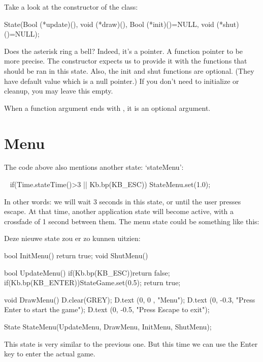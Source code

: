 Take a look at the constructor of the  class:

\begin{code}
State(Bool (*update)(), void (*draw)(), Bool (*init)()=NULL, void (*shut)()=NULL); 
\end{code}

Does the asterisk ring a bell? Indeed, it's a pointer. A function pointer to be more precise. The constructor expects us to provide it with the functions that should be ran in this state. Also, the init and shut functions are optional. (They have default value which is a null pointer.) If you don't need to initialize or cleanup, you may leave this empty.

\begin{note}
When a function argument ends with , it is an optional argument.
\end{note} 

\section{Menu}
The code above also mentions another state: `stateMenu':

\begin{code}
   if(Time.stateTime()>3 || Kb.bp(KB_ESC)) {
      StateMenu.set(1.0);                    
   }
\end{code}

In other words: we will wait 3 seconds in this state, or until the user presses escape. At that time, another application state will become active, with a crossfade of 1 second between them. The menu state could be something like this:

Deze nieuwe state zou er zo kunnen uitzien:
\begin{code}
bool InitMenu() {return true;}
void ShutMenu() {}

bool UpdateMenu()
{
   if(Kb.bp(KB_ESC))return false;
   if(Kb.bp(KB_ENTER))StateGame.set(0.5);
   return true;
}

void DrawMenu()
{
   D.clear(GREY);
   D.text (0,  0  , "Menu");
   D.text (0, -0.3, "Press Enter to start the game");
   D.text (0, -0.5, "Press Escape to exit");
}

State StateMenu(UpdateMenu, DrawMenu, InitMenu, ShutMenu);
\end{code}

This state is very similar to the previous one. But this time we can use the Enter key to enter the actual game. 

